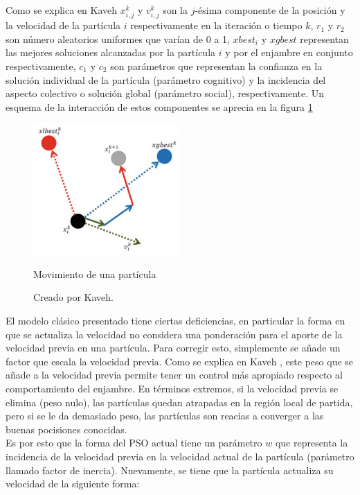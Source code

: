Como se explica en Kaveh \cite{Psoexplain14} $x_{i,j}^{k}$ y $v_{i,j}^{k}$ son la $j$-ésima componente de la posición y la velocidad de la partícula $i$ respectivamente en la iteración o tiempo $k$, $r_{1}$ y $r_{2}$ son número aleatorios uniformes que varían de 0 a 1, $xbest_i$ y $xgbest$ representan las mejores soluciones alcanzadas por la partícula $i$ y por el enjambre en conjunto respectivamente, $c_1$ y $c_2$ son parámetros que representan la confianza en la solución individual de la partícula (parámetro cognitivo) y la incidencia del aspecto colectivo o solución global (parámetro social), respectivamente. Un esquema de la interacción de estos componentes se aprecia en la figura \ref{fig:move_part}\\
\begin{figure}[h!]
    \centering    
    \includegraphics[height=50mm]{figures/move_particle.png} 
    \caption{Movimiento de una partícula}
    \vspace{-.25cm} 
    \caption*{Creado por Kaveh\cite{Psoexplain14}.}
    \label{fig:move_part}
\end{figure}
El modelo clásico presentado tiene ciertas deficiencias, en particular la forma en que se actualiza la velocidad no considera una ponderación para el aporte de la velocidad previa en una partícula. Para corregir esto, simplemente se añade un factor que escala la velocidad previa. Como se explica en Kaveh \cite{Psoexplain14}, este peso que se añade a la velocidad previa permite tener un control más apropiado respecto al comportamiento del enjambre. En términos extremos, si la velocidad previa se elimina (peso nulo), las partículas quedan atrapadas en la región local de partida, pero si se le da demasiado peso, las partículas son reacias a converger a las buenas pocisiones conocidas.\\
Es por esto que la forma del PSO actual tiene un parámetro $w$ que representa la incidencia de la velocidad previa en la velocidad actual de la partícula (parámetro llamado factor de inercia). Nuevamente, se tiene que la partícula actualiza su velocidad de la siguiente forma: 
